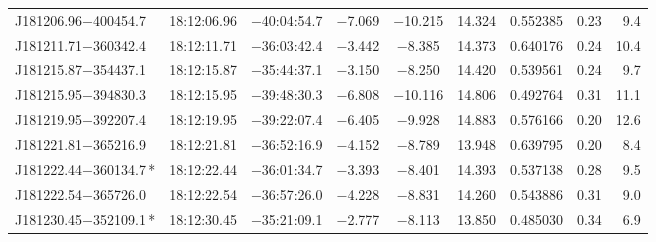 \begin{table*}
\begin{tabular}{lcccccccr}
J181206.96$-$400454.7 & 18:12:06.96 & $-$40:04:54.7 & $-$7.069 & $-$10.215 & 14.324 & 0.552385 & 0.23 & 9.4 \\
J181211.71$-$360342.4 & 18:12:11.71 & $-$36:03:42.4 & $-$3.442 & $-$8.385 & 14.373 & 0.640176 & 0.24 & 10.4 \\
J181215.87$-$354437.1 & 18:12:15.87 & $-$35:44:37.1 & $-$3.150 & $-$8.250 & 14.420 & 0.539561 & 0.24 & 9.7 \\
J181215.95$-$394830.3 & 18:12:15.95 & $-$39:48:30.3 & $-$6.808 & $-$10.116 & 14.806 & 0.492764 & 0.31 & 11.1 \\
J181219.95$-$392207.4 & 18:12:19.95 & $-$39:22:07.4 & $-$6.405 & $-$9.928 & 14.883 & 0.576166 & 0.20 & 12.6 \\
J181221.81$-$365216.9 & 18:12:21.81 & $-$36:52:16.9 & $-$4.152 & $-$8.789 & 13.948 & 0.639795 & 0.20 & 8.4 \\
J181222.44$-$360134.7\,* & 18:12:22.44 & $-$36:01:34.7 & $-$3.393 & $-$8.401 & 14.393 & 0.537138 & 0.28 & 9.5 \\
J181222.54$-$365726.0 & 18:12:22.54 & $-$36:57:26.0 & $-$4.228 & $-$8.831 & 14.260 & 0.543886 & 0.31 & 9.0 \\
J181230.45$-$352109.1\,* & 18:12:30.45 & $-$35:21:09.1 & $-$2.777 & $-$8.113 & 13.850 & 0.485030 & 0.34 & 6.9 \\
\hline
\end{tabular}
\end{table*}

\addtocounter{table}{-1}

